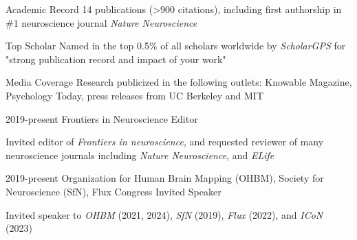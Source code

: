 

\begin{cvskills}

\cvskill
   {Academic Record}
   {14 publications (>900 citations), including first authorship in \#1 neuroscience journal \textit{Nature Neuroscience}}  
     
 \cvskill
   {Top Scholar}
   {Named in the top 0.5\% of all scholars worldwide by \textit{ScholarGPS} for "strong publication record and impact of your work"}    
 
 \cvskill
   {Media Coverage}
   {Research publicized in the following outlets: Knowable Magazine, Psychology Today, press releases from UC Berkeley and MIT}
 

\end{cvskills}


  \cventry 
    {2019-present} %
    {Frontiers in Neuroscience}
    {Editor} %
    {} %
    {
      \begin{cvitems} 
      	\item {Invited editor of \textit{Frontiers in neuroscience}, and requested reviewer of many neuroscience journals including \textit{Nature Neuroscience}, and \textit{ELife}}
      \end{cvitems}
    }
    
  \cventry 
    {2019-present} %
    {Organization for Human Brain Mapping (OHBM), Society for Neuroscience (SfN), Flux Congress}
    {Invited Speaker} %
    {} %
    {
      \begin{cvitems} 
      	\item {Invited speaker to \textit{OHBM} (2021, 2024), \textit{SfN} (2019), \textit{Flux} (2022), and \textit{ICoN} (2023)}
      \end{cvitems}
    }